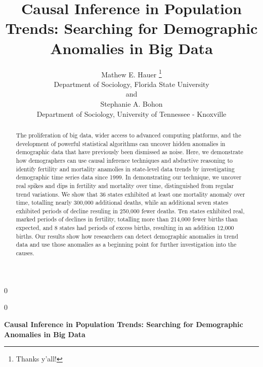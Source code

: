 \documentclass[12pt]{article}
\newcommand{\blind}{0}
\begin{document}
\def\spacingset#1{\renewcommand{\baselinestretch}%
{#1}\small\normalsize} \spacingset{1}



\blind
{
  \title{\bf Causal Inference in Population Trends: Searching for Demographic
Anomalies in Big Data}

  \author{
        Mathew E. Hauer \thanks{Thanks y'all!} \\
    Department of Sociology, Florida State University\\
     and \\     Stephanie A. Bohon \\
    Department of Sociology, University of Tennessee - Knoxville\\
      }
  \maketitle
} \fi

\blind
{
  \bigskip
  \bigskip
  \bigskip
  \begin{center}
    {\LARGE\bf Causal Inference in Population Trends: Searching for Demographic
Anomalies in Big Data}
  \end{center}
  \medskip
} \fi

\bigskip
\begin{abstract}
The proliferation of big data, wider access to advanced computing
platforms, and the development of powerful statistical algorithms can
uncover hidden anomalies in demographic data that have previously been
dismissed as noise. Here, we demonstrate how demographers can use causal
inference techniques and abductive reasoning to identify fertility and
mortality anamolies in state-level data trends by investigating
demographic time series data since 1999. In demonstrating our technique,
we uncover real spikes and dips in fertility and mortality over time,
distinguished from regular trend variations. We show that 36 states
exhibited at least one mortality anomaly over time, totalling nearly
300,000 additional deaths, while an additional seven states exhibited
periods of decline resuling in 250,000 fewer deaths. Ten states
exhibited real, marked periods of declines in fertility, totalling more
than 214,000 fewer births than expected, and 8 states had periods of
excess births, resulting in an addition 12,000 births. Our results show
how researchers can detect demographic anomalies in trend data and use
those anomalies as a beginning point for further investigation into the
causes.
\end{abstract}
\end{document}
